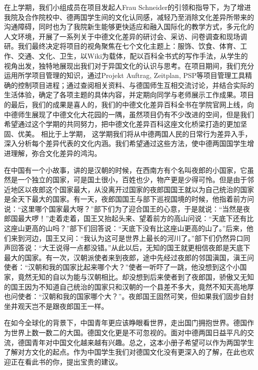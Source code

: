 \par
 在上学期，我们小组成员在项目发起人Frau Schneider的引领和指导下，为了增进我院及合作院校中、德两国学生间的文化认同感，减轻乃至消除文化差异所带来的沟通障碍，同时也为了我院新生能够更快适应和融入国际化的教学方式，多元化的人文环境，开展了一系列关于中德文化差异的研讨会、采访、问卷调查和现场调研。我们最终决定将项目的视角聚焦在七个文化主题上：服饰、饮食、体育、工作、交通、文化、卫生，以Wiki为载体，配以百科全书式的写作手法，从学生的视角出发，独特地展现出我们对于异国文化的认识与思考。在项目期间，我们充分运用所学项目管理的知识，通过Projekt Auftrag, Zeitplan, PSP等项目管理工具精确的控制项目进程；通过查阅相关资料、与德国师生互相交流讨论，并结合实际的生活体验，确定了各项主题的具体内容，并定期向同学与老师展示工作成果。项目的最后，我们的成果是喜人的，我们的中德文化差异百科全书在学院官网上线，向中德师生展现了中德文化大花园的一隅，虽然项目仍有不少改进的空间，但是我们希望通过这个学期的共同努力，把中德文化差异百科这座文化桥梁打造的更加坚固、优美。 相比于上学期， 这学期我们将从中德两国人民的日常行为差异入手，深入分析每个差异代表的文化内涵。我们希望通过这些方法，使中德两国国学生增进理解，弥合文化差异的鸿沟。
 \par
 在中国有一个小故事，讲的是汉朝的时候，在西南方有个名叫夜郎的小国家，它虽然是一个独立的国家，可是国土很小，百姓也少，物产更是少得可怜。但是由于邻近地区以夜郎这个国家最大，从没离开过国家的夜郎国国王就以为自己统治的国家是全天下最大的国家。有一天，夜郎国国王与部下巡视国境的时候，他指着前方问说：“这里哪个国家最大呀？”部下们为了迎合国王的心意，于是就说：“当然是夜郎国最大啰！”走着走着，国王又抬起头来、望着前方的高山问说：“天底下还有比这座山更高的山吗？”部下们回答说：“天底下没有比这座山更高的山了。”后来，他们来到河边，国王又问：“我认为这可是世界上最长的河川了。”部下们仍然异口同声回答说：“大王说得一点都没错。”从此以后，无知的国王就更相信夜郎是天底下最大的国家。有一次，汉朝派使者来到夜郎，途中先经过夜郎的邻国滇国，滇王问使者：“汉朝和我的国家比起来哪个大？”使者一听吓了一跳，他没想到这个小国家，竟然无知的自以为能与汉朝相比。却没想到后来使者到了夜郎国，骄傲又无知的国王因为不知道自己统治的国家只和汉朝的一个县差不多大，竟然不知天高地厚也问使者：“汉朝和我的国家哪个大？”。夜郎国王固然可笑，但如果我们固步自封坐井观天岂不是跟夜郎国王一样。
 \par
 在如今全球化的背景下，中国青年更应该睁眼看世界，走出国门拥抱世界。德国作为世界上数一数二的大国。德国文化更是不可忽视的。面对中德两国日益平凡的交流，德国青年对中国文化越来越有兴趣。总之，这本小册子希望可以作为两国学生了解对方文化的起点。作为中国学生我们对德国文化没有更深入的了解，在此也欢迎正在看此书的你，提出宝贵的建议。
\vspace{\baselineskip} 
